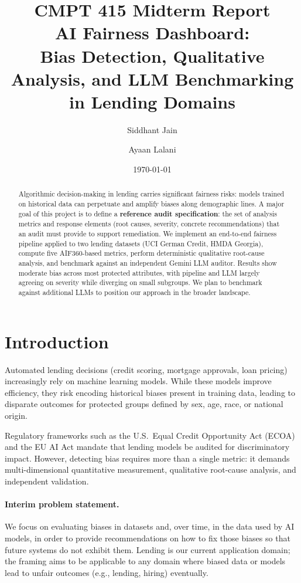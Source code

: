 \documentclass[11pt,a4paper]{article}
\title{%
  \textbf{CMPT 415 Midterm Report}\\[6pt]
  \Large AI Fairness Dashboard:\\[2pt]
  \large Bias Detection, Qualitative Analysis, and LLM Benchmarking\\
  in Lending Domains
}
\author{
  Siddhant Jain \and Ayaan Lalani
}
\date{\today}
\begin{document}
\maketitle

\begin{abstract}
Algorithmic decision-making in lending carries significant fairness risks:
models trained on historical data can perpetuate and amplify biases along
demographic lines. A major goal of this project is to define a
\textbf{reference audit specification}: the set of analysis metrics and
response elements (root causes, severity, concrete recommendations) that
an audit must provide to support remediation. We implement an end-to-end
fairness pipeline applied to two lending datasets (UCI German Credit,
HMDA Georgia), compute five AIF360-based metrics, perform deterministic
qualitative root-cause analysis, and benchmark against an independent
Gemini LLM auditor. Results show moderate bias across most protected
attributes, with pipeline and LLM largely agreeing on severity while
diverging on small subgroups. We plan to benchmark against additional LLMs
to position our approach in the broader landscape.
\end{abstract}

\section{Introduction}

Automated lending decisions (credit scoring, mortgage approvals, loan
pricing) increasingly rely on machine learning models. While these models
improve efficiency, they risk encoding historical biases present in
training data, leading to disparate outcomes for protected groups defined
by sex, age, race, or national origin.

Regulatory frameworks such as the U.S.\ Equal Credit Opportunity Act (ECOA)
and the EU AI Act mandate that lending models be audited for discriminatory
impact. However, detecting bias requires more than a single metric: it
demands multi-dimensional quantitative measurement, qualitative root-cause
analysis, and independent validation.

\paragraph{Interim problem statement.}
We focus on evaluating biases in datasets and, over time, in the data used
by AI models, in order to provide recommendations on how to fix those
biases so that future systems do not exhibit them. Lending is our current
application domain; the framing aims to be applicable to any domain where
biased data or models lead to unfair outcomes (e.g., lending, hiring)
eventually.
\end{document}
